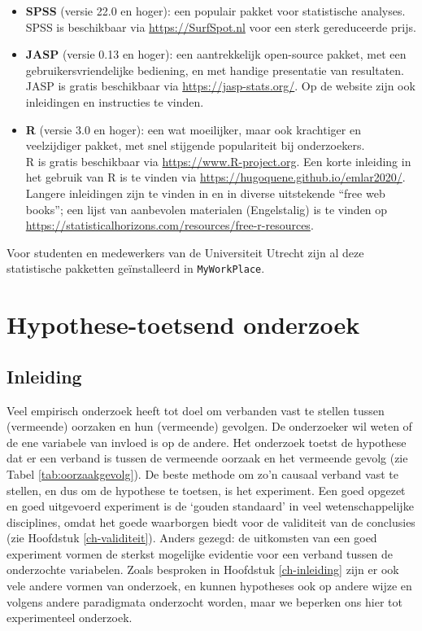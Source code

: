 \documentclass[
]{book}
\begin{document}
\begin{itemize}
\item
  \textbf{SPSS} (versie 22.0 en hoger): een populair pakket voor statistische analyses.\\
  SPSS is beschikbaar via \url{https://SurfSpot.nl} voor een sterk gereduceerde prijs.
\item
  \textbf{JASP} (versie 0.13 en hoger): een aantrekkelijk open-source pakket, met een gebruikersvriendelijke bediening, en met handige presentatie van resultaten.\\
  JASP is gratis beschikbaar via \url{https://jasp-stats.org/}. Op de website zijn ook inleidingen en instructies te vinden.
\item
  \textbf{R} (versie 3.0 en hoger): een wat moeilijker, maar ook krachtiger en veelzijdiger pakket, met snel stijgende populariteit bij onderzoekers.\\
  R is gratis beschikbaar via \url{https://www.R-project.org}.
  Een korte inleiding in het gebruik van R is te vinden via \url{https://hugoquene.github.io/emlar2020/}.
  Langere inleidingen zijn te vinden in \citet{Dalg02} en in diverse uitstekende ``free web books'';
  een lijst van aanbevolen materialen (Engelstalig) is te vinden op
  \url{https://statisticalhorizons.com/resources/free-r-resources}.
\end{itemize}

Voor studenten en medewerkers van de Universiteit Utrecht zijn al deze statistische pakketten geïnstalleerd in \texttt{MyWorkPlace}.

\chapter{Hypothese-toetsend onderzoek}\label{ch-onderzoek}

\section{Inleiding}\label{inleiding}

Veel empirisch onderzoek heeft tot doel om verbanden vast te stellen
tussen (vermeende) oorzaken en hun (vermeende) gevolgen. De onderzoeker
wil weten of de ene variabele van invloed is op de andere. Het onderzoek
toetst de hypothese dat er een verband is tussen de vermeende oorzaak en
het vermeende gevolg (zie Tabel \ref{tab:oorzaakgevolg}).
De beste methode om zo'n causaal verband vast
te stellen, en dus om de hypothese te toetsen, is het experiment. Een
goed opgezet en goed uitgevoerd experiment is de `gouden standaard' in
veel wetenschappelijke disciplines, omdat het goede waarborgen biedt
voor de validiteit van de conclusies (zie
Hoofdstuk \ref{ch-validiteit}).
Anders gezegd: de uitkomsten van een goed
experiment vormen de sterkst mogelijke evidentie voor een verband tussen
de onderzochte variabelen. Zoals besproken in
Hoofdstuk \ref{ch-inleiding} zijn er ook vele andere vormen van onderzoek,
en kunnen hypotheses ook op andere wijze en volgens andere paradigmata
onderzocht worden, maar we beperken ons hier tot experimenteel
onderzoek.
\end{document}
